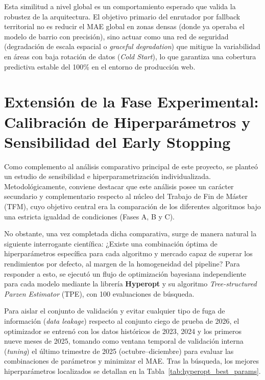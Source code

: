 \documentclass[a4paper,11pt,openany]{book}
\begin{document}
Esta similitud a nivel global es un comportamiento esperado que valida la robustez de la arquitectura. El objetivo primario del enrutador por fallback territorial no es reducir el MAE global en zonas densas (donde ya operaba el modelo de barrio con precisión), sino actuar como una red de seguridad (degradación de escala espacial o \textit{graceful degradation}) que mitigue la variabilidad en áreas con baja rotación de datos (\textit{Cold Start}), lo que garantiza una cobertura predictiva estable del 100\% en el entorno de producción web.

\section{Extensión de la Fase Experimental: Calibración de Hiperparámetros y Sensibilidad del Early Stopping}
Como complemento al análisis comparativo principal de este proyecto, se planteó un estudio de sensibilidad e hiperparametrización individualizada. Metodológicamente, conviene destacar que este análisis posee un carácter secundario y complementario respecto al núcleo del Trabajo de Fin de Máster (TFM), cuyo objetivo central era la comparación de los diferentes algoritmos bajo una estricta igualdad de condiciones (Fases A, B y C). 

No obstante, una vez completada dicha comparativa, surge de manera natural la siguiente interrogante científica: ¿Existe una combinación óptima de hiperparámetros específica para cada algoritmo y mercado capaz de superar los rendimientos por defecto, al margen de la homogeneidad del pipeline? Para responder a esto, se ejecutó un flujo de optimización bayesiana independiente para cada modelo mediante la librería \textbf{Hyperopt} y su algoritmo \textit{Tree-structured Parzen Estimator} (TPE), con 100 evaluaciones de búsqueda.

Para aislar el conjunto de validación y evitar cualquier tipo de fuga de información (\textit{data leakage}) respecto al conjunto ciego de prueba de 2026, el optimizador se entrenó con los datos históricos de 2023, 2024 y los primeros nueve meses de 2025, tomando como ventana temporal de validación interna (\textit{tuning}) el último trimestre de 2025 (octubre--diciembre) para evaluar las combinaciones de parámetros y minimizar el MAE. Tras la búsqueda, los mejores hiperparámetros localizados se detallan en la Tabla~\ref{tab:hyperopt_best_params}.
\end{document}
